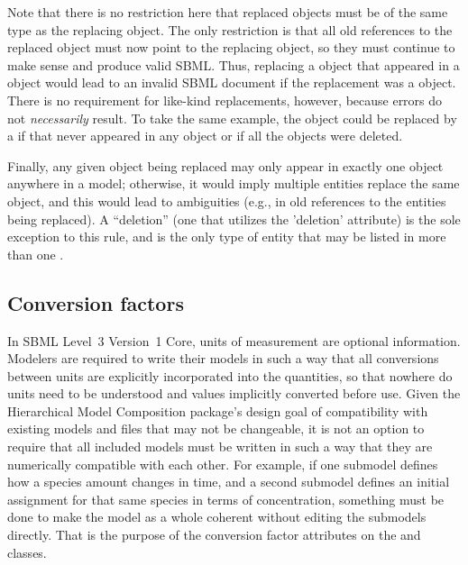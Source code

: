 
Note that there is no restriction here that replaced objects must be of
the same type as the replacing object.  The only restriction is that all
old references to the replaced object must now point to the replacing
object, so they must continue to make sense and produce valid SBML.
Thus, replacing a \Species object that appeared in a \Reaction object
would lead to an invalid SBML document if the replacement was a
\Parameter object.  There is no requirement for like-kind replacements,
however, because errors do not \emph{necessarily} result.  To take the
same example, the \Species object could be replaced by a \Parameter if
that \Species never appeared in any \Reaction object or if all the
\Reaction objects were deleted.  

Finally, any given object being replaced may only appear in exactly one
\ReplacedElement object anywhere in a model; otherwise, it would imply
multiple entities replace the same object, and this would lead to
ambiguities (e.g., in old references to the entities being replaced).  
A ``deletion'' \ReplacedElement (one that utilizes the 'deletion' attribute) is the sole exception to this rule, and
is the only type of entity that may be listed in more than one
\ListOfReplacedElements.


\subsection{Conversion factors}
\label{conversion-factors}

In SBML Level~3 Version~1 Core, units of measurement are optional
information.  Modelers are required to write their models in such a way
that all conversions between units are explicitly incorporated into the
quantities, so that nowhere do units need to be understood and values
implicitly converted before use.  Given the Hierarchical Model
Composition package's design goal of compatibility with existing models
and files that may not be changeable, it is not an option to require
that all included models must be written in such a way that they are
numerically compatible with each other.  For example, if one submodel
defines how a species amount changes in time, and a second submodel
defines an initial assignment for that same species in terms of
concentration, something must be done to make the model as a whole
coherent without editing the submodels directly.  That is the purpose of
the conversion factor attributes on the \Submodel and \ReplacedElement
classes.

